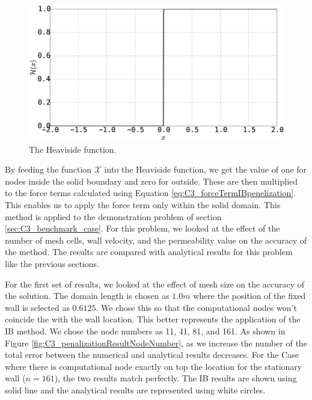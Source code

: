 \begin{figure}[H]
	\centering
	\includegraphics[width=14.cm]{Chapter_3/figure/Heaviside_Function.eps}
	\caption{The Heaviside function.}
	\label{{fig:C3_heavisideFunction}}
\end{figure}

By feeding the function $\mathcal{X}$ into the Heaviside function, we get the value of one for nodes inside the solid boundary and zero for outside. These are then multiplied to the force terms calculated using Equation \eqref{eq:C3_forceTermIBpenelization}. This enables us to apply the force term only within the solid domain. This method is applied to the demonstration problem of section \ref{sec:C3_benchmark_case}. For this problem, we looked at the effect of the number of mesh cells, wall velocity, and the permeability value on the accuracy of the method. The results are compared with analytical results for this problem like the previous sections.

For the first set of results, we looked at the effect of mesh size on the accuracy of the solution. The domain length is chosen as $1.0 m$ where the position of the fixed wall is selected as $0.6125$. We chose this so that the computational nodes won't coincide the with the wall location. This better represents the application of the IB method. We chose the node numbers as 11, 41, 81, and 161. As shown in Figure \ref{fig:C3_penalizationResultNodeNumber}, as we increase the number of the total error between the numerical and analytical results decreases. For the Case where there is computational node exactly on top the location for the stationary wall ($n=161$), the two results match perfectly. The IB results are shown using solid line and the analytical results are represented using white circles.

